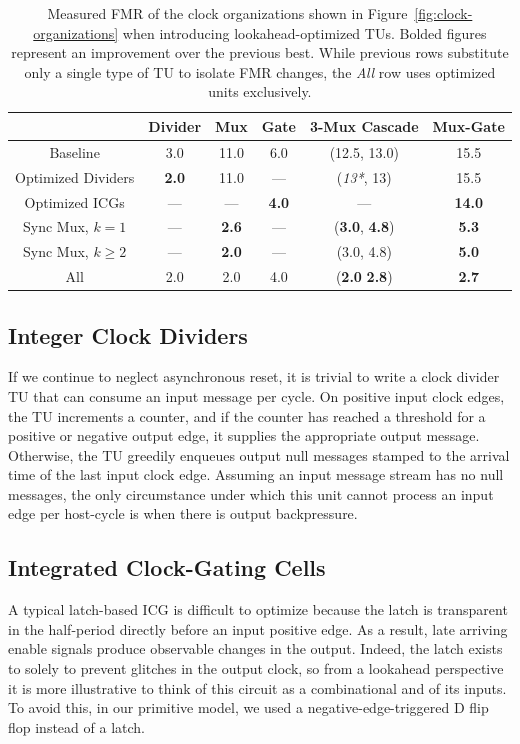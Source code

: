 \begin{table}[t]
\centering
    \begin{tabular}{c c c c c c}
           & \textbf{Divider} & \textbf{Mux} & \textbf{Gate} & \textbf{3-Mux Cascade} & \textbf{Mux-Gate} \\
    \hline
          Baseline        & 3.0 & 11.0  & 6.0 & (12.5, 13.0) & 15.5 \\
          Optimized Dividers   & \textbf{2.0} & 11.0          & ---        & (\emph{13*}, 13)             & 15.5 \\
          Optimized ICGs       & ---          & ---           & \textbf{4.0} &  ---                          & \textbf{14.0} \\
          Sync Mux, $k = 1$  & ---          & \textbf{2.6}  & ---        & (\textbf{3.0}, \textbf{4.8}) & \textbf{5.3} \\
          Sync Mux, $k \geq 2$ & ---          & \textbf{2.0}  & ---       & (3.0, 4.8)                   & \textbf{5.0} \\
    \hline
          All & 2.0 & 2.0 & 4.0 & (\textbf{2.0} \textbf{2.8}) & \textbf{2.7} \\
    \end{tabular}
    \caption{Measured FMR of the clock organizations shown in Figure~\ref{fig:clock-organizations} when introducing
    lookahead-optimized TUs. Bolded figures represent an improvement over the previous best. While previous rows
    substitute only a single type of TU to isolate FMR changes, the \emph{All} row uses optimized units exclusively.}
    \label{tbl:pdes-optimized-fmrs}
\end{table}

\subsection{Integer Clock Dividers}
If we continue to neglect asynchronous reset, it is trivial to write a
clock divider TU that can consume an input message per cycle. On
positive input clock edges, the TU increments a counter, and if the counter has
reached a threshold for a positive or negative output edge, it supplies the
appropriate output message.  Otherwise, the TU greedily enqueues output
null messages stamped to the arrival time of the last input clock edge.
Assuming an input message stream has no null messages, the only
circumstance under which this unit cannot process an input edge per host-cycle
is when there is output backpressure.

\subsection{Integrated Clock-Gating Cells}
A typical latch-based ICG is difficult to optimize because the latch
is transparent in the half-period directly before an input positive edge. As a
result, late arriving enable signals produce observable changes in the output.
Indeed, the latch exists to solely to prevent glitches in the output clock, so
from a lookahead perspective it is more illustrative to think of this circuit as
a combinational and of its inputs.  To avoid this, in our
primitive model, we used a negative-edge-triggered D flip flop instead of a
latch.

